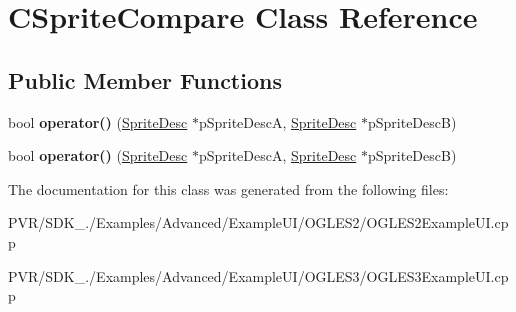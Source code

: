 \hypertarget{class_c_sprite_compare}{\section{C\+Sprite\+Compare Class Reference}
\label{class_c_sprite_compare}
}
\subsection*{Public Member Functions}
\begin{DoxyCompactItemize}
\item 
\hypertarget{class_c_sprite_compare_a8beb31ebf7f9091f0da6c2225bd8aa05}{bool {\bfseries operator()} (\hyperlink{struct_sprite_desc}{Sprite\+Desc} $\ast$p\+Sprite\+Desc\+A, \hyperlink{struct_sprite_desc}{Sprite\+Desc} $\ast$p\+Sprite\+Desc\+B)}\label{class_c_sprite_compare_a8beb31ebf7f9091f0da6c2225bd8aa05}

\item 
\hypertarget{class_c_sprite_compare_a8beb31ebf7f9091f0da6c2225bd8aa05}{bool {\bfseries operator()} (\hyperlink{struct_sprite_desc}{Sprite\+Desc} $\ast$p\+Sprite\+Desc\+A, \hyperlink{struct_sprite_desc}{Sprite\+Desc} $\ast$p\+Sprite\+Desc\+B)}\label{class_c_sprite_compare_a8beb31ebf7f9091f0da6c2225bd8aa05}

\end{DoxyCompactItemize}


The documentation for this class was generated from the following files\+:\begin{DoxyCompactItemize}
\item 
P\+V\+R/\+S\+D\+K\+\_./\+Examples/\+Advanced/\+Example\+U\+I/\+O\+G\+L\+E\+S2/O\+G\+L\+E\+S2\+Example\+U\+I.\+cpp\item 
P\+V\+R/\+S\+D\+K\+\_./\+Examples/\+Advanced/\+Example\+U\+I/\+O\+G\+L\+E\+S3/O\+G\+L\+E\+S3\+Example\+U\+I.\+cpp\end{DoxyCompactItemize}
